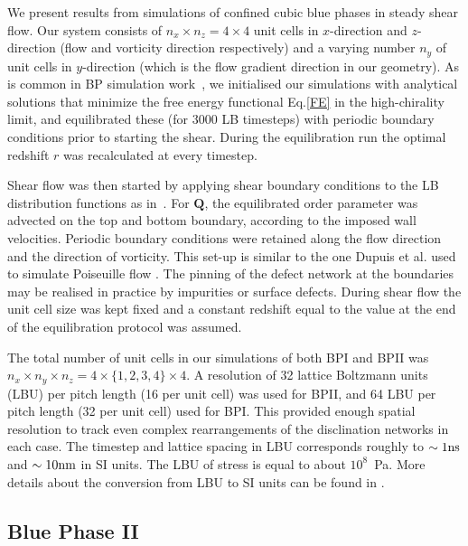 \documentclass[12pt,twoside]{iopart}
\begin{document}
We present results from simulations of confined cubic blue
phases in steady shear flow.
Our system consists of $n_x\times n_z = 4\times4$ unit cells in $x$-direction
and $z$-direction (flow and vorticity direction respectively) and a varying
number $n_y$ of unit cells in $y$-direction (which is the flow gradient
direction in our geometry).
As is common in BP simulation work~\cite{Henrich:2011a,Henrich:2010b}, we initialised our simulations with analytical solutions that minimize the free energy functional Eq.\ref{FE} in the high-chirality limit, and equilibrated these (for 3000 LB timesteps) with periodic boundary conditions prior to starting the shear. During the equilibration run the optimal redshift $r$ was recalculated
at every timestep.

Shear flow was then started by applying shear boundary conditions to the LB distribution functions as in~\cite{Denniston:2004}. For ${\mathbf Q}$, the equilibrated order parameter was advected on the top and bottom boundary, according to the imposed wall velocities. Periodic boundary conditions were retained along the flow direction and the direction of vorticity.
This set-up is similar to the one Dupuis et al. used to simulate Poiseuille flow \cite{Dupuis:2005}. The pinning of the defect network at the boundaries may be realised in practice by impurities or surface defects.
During shear flow the unit cell size was kept fixed and a constant redshift equal to the value at the end of the equilibration protocol was assumed.

The total number of unit cells in our simulations of both BPI and BPII
was $n_x\times n_y \times n_z= 4 \times \{1,2,3,4\} \times 4$.
A resolution of 32 lattice Boltzmann units (LBU) per pitch length
(16 per unit cell) was used for BPII, and 64 LBU per pitch length
(32 per unit cell) used for BPI.  
This provided enough spatial resolution to track even complex rearrangements
of the disclination networks in each case.
The timestep and lattice spacing in LBU corresponds roughly to
$\sim 1 {\rm ns}$ and $\sim 10{\rm nm}$ in SI units. The LBU of stress
is equal to about $10^8$~Pa. 
More details about the conversion from LBU to SI units can be found in
\cite{Henrich:2011a,Henrich:2010b}.

\subsection{Blue Phase II}\label{sec_bpii}
\end{document}
